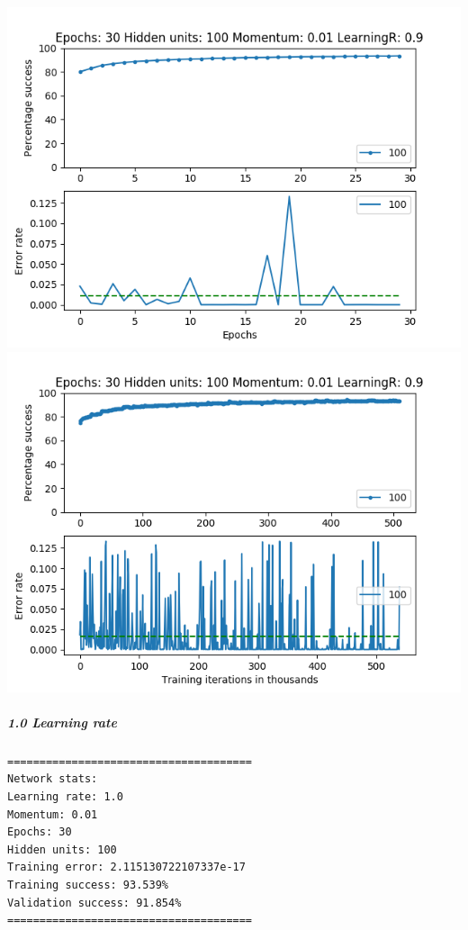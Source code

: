 \documentclass[11pt]{article}
\makeatletter
\def\maxwidth{\ifdim\Gin@nat@width>\linewidth\linewidth
    \else\Gin@nat@width\fi}
\let\Oldincludegraphics\includegraphics
\renewcommand{\includegraphics}[1]{\Oldincludegraphics[width=.8\maxwidth]{#1}}
\makeatother
\begin{document}
\includegraphics{Experiment2/E2_NN_Epoch_Momentum_0.01_30Epochs_100_LR_0.9_Hiddenunits.png}
\includegraphics{Experiment2/E2_NN_Training_Momentum_0.01_30Epochs_100_LR_0.9_Hiddenunits.png}

\hypertarget{learning-rate-10}{%
\subparagraph{1.0 Learning rate}\label{learning-rate-10}}

\begin{verbatim}
======================================
Network stats: 
Learning rate: 1.0
Momentum: 0.01
Epochs: 30
Hidden units: 100
Training error: 2.115130722107337e-17
Training success: 93.539%
Validation success: 91.854%
======================================
\end{verbatim}
\end{document}
